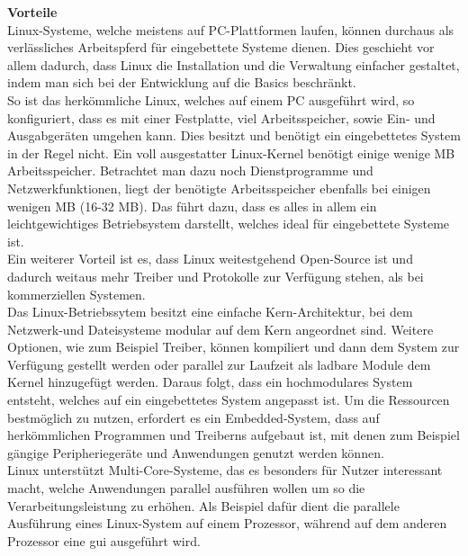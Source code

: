 \textbf{Vorteile}\\
Linux-Systeme, welche meistens auf PC-Plattformen laufen, können durchaus als verlässliches Arbeitspferd für eingebettete Systeme dienen.
Dies geschieht vor allem dadurch, dass Linux die Installation und die Verwaltung einfacher gestaltet, indem man sich bei der Entwicklung
auf die Basics beschränkt.\\
So ist das herkömmliche Linux, welches auf einem PC ausgeführt wird, so konfiguriert, dass es mit einer Festplatte, viel Arbeitsspeicher, sowie Ein- und Ausgabgeräten umgehen kann.
Dies besitzt und benötigt ein eingebettetes System in der Regel nicht. Ein voll ausgestatter Linux-Kernel benötigt einige wenige MB Arbeitsspeicher. Betrachtet man dazu noch Dienstprogramme
und Netzwerkfunktionen, liegt der benötigte
 Arbeitsspeicher ebenfalls bei einigen wenigen MB (16-32 MB). Das führt dazu, dass es alles in allem ein leichtgewichtiges
 Betriebsystem darstellt, welches ideal für eingebettete Systeme ist.\\
 Ein weiterer Vorteil ist es, dass Linux weitestgehend Open-Source ist und dadurch weitaus mehr Treiber und Protokolle zur Verfügung stehen, als bei kommerziellen Systemen. \\
 Das Linux-Betriebssytem besitzt eine einfache Kern-Architektur, bei dem Netzwerk-und Dateisysteme modular auf dem Kern angeordnet sind. Weitere Optionen, wie zum Beispiel Treiber,
  können kompiliert und dann dem System zur Verfügung gestellt werden
 oder parallel zur Laufzeit als ladbare Module dem Kernel hinzugefügt werden. Daraus folgt, dass ein hochmodulares System entsteht, welches auf ein eingebettetes System angepasst ist.
 \newpage
 Um die Ressourcen bestmöglich zu nutzen, erfordert es ein Embedded-System, dass auf herkömmlichen Programmen und Treiberns aufgebaut ist, mit denen zum Beispiel gängige Peripheriegeräte und
 Anwendungen genutzt werden können.\\
 Linux unterstützt Multi-Core-Systeme, das es besonders für Nutzer interessant macht, welche Anwendungen parallel ausführen wollen um so die Verarbeitungsleistung zu erhöhen.
  Als Beispiel dafür dient die parallele Ausführung eines Linux-System auf einem Prozessor,
  während auf dem anderen Prozessor eine \ac{gui} ausgeführt wird.\cite{ibm}\\

